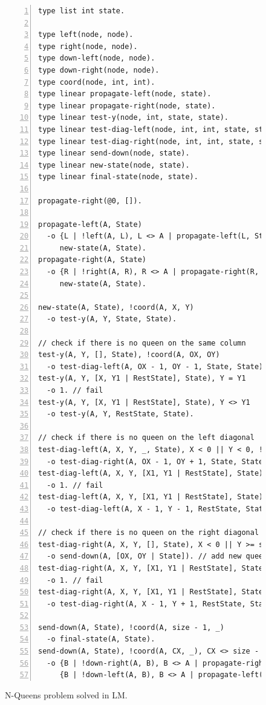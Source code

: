 \begin{figure}[h!]
\begin{Verbatim}[numbers=left,fontsize=\scriptsize]
type list int state.

type left(node, node).
type right(node, node).
type down-left(node, node).
type down-right(node, node).
type coord(node, int, int).
type linear propagate-left(node, state).
type linear propagate-right(node, state).
type linear test-y(node, int, state, state).
type linear test-diag-left(node, int, int, state, state).
type linear test-diag-right(node, int, int, state, state).
type linear send-down(node, state).
type linear new-state(node, state).
type linear final-state(node, state).

propagate-right(@0, []).

propagate-left(A, State)
  -o {L | !left(A, L), L <> A | propagate-left(L, State)},
     new-state(A, State).
propagate-right(A, State)
  -o {R | !right(A, R), R <> A | propagate-right(R, State)},
     new-state(A, State).

new-state(A, State), !coord(A, X, Y)
  -o test-y(A, Y, State, State).

// check if there is no queen on the same column
test-y(A, Y, [], State), !coord(A, OX, OY)
  -o test-diag-left(A, OX - 1, OY - 1, State, State).
test-y(A, Y, [X, Y1 | RestState], State), Y = Y1
  -o 1. // fail
test-y(A, Y, [X, Y1 | RestState], State), Y <> Y1
  -o test-y(A, Y, RestState, State).

// check if there is no queen on the left diagonal
test-diag-left(A, X, Y, _, State), X < 0 || Y < 0, !coord(A, OX, OY)
  -o test-diag-right(A, OX - 1, OY + 1, State, State).
test-diag-left(A, X, Y, [X1, Y1 | RestState], State), X = X1, Y = Y1
  -o 1. // fail
test-diag-left(A, X, Y, [X1, Y1 | RestState], State), X <> X1 || Y <> Y1
  -o test-diag-left(A, X - 1, Y - 1, RestState, State).

// check if there is no queen on the right diagonal
test-diag-right(A, X, Y, [], State), X < 0 || Y >= size, !coord(A, OX, OY)
  -o send-down(A, [OX, OY | State]). // add new queen
test-diag-right(A, X, Y, [X1, Y1 | RestState], State), X = X1, Y = Y1
  -o 1. // fail
test-diag-right(A, X, Y, [X1, Y1 | RestState], State), X <> X1 || Y <> Y1
  -o test-diag-right(A, X - 1, Y + 1, RestState, State).

send-down(A, State), !coord(A, size - 1, _)
  -o final-state(A, State).
send-down(A, State), !coord(A, CX, _), CX <> size - 1
  -o {B | !down-right(A, B), B <> A | propagate-right(B, State)},
     {B | !down-left(A, B), B <> A | propagate-left(B, State)}.
\end{Verbatim}
  \caption{N-Queens problem solved in LM.}
  \label{coordination:code:nqueens}
\end{figure}

